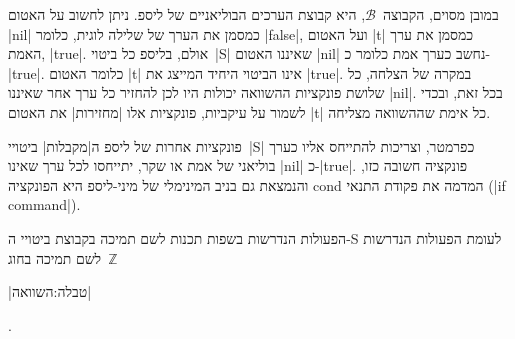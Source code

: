 במובן מסוים, הקבוצה~$\mathcal{B}$, היא קבוצת הערכים הבוליאניים של ליספ. ניתן
לחשוב על האטום \T|nil| כמסמן את הערך של שלילה לוגית, כלומר \E|false|, ועל האטום
\T|t| כמסמן את ערך האמת, \E|true|. אולם, בליספ כל ביטוי~\E|S| שאיננו האטום
\T|nil| נחשב כערך אמת כלומר כ-\E|true|. כלומר האטום \T|t| אינו הביטוי היחיד
המייצג את \E|true|. במקרה של הצלחה, כל שלושת פונקציות ההשוואה יכולות היו לכן
להחזיר כל ערך אחר שאיננו \T|nil|. בכל זאת, ובכדי לשמור על עיקביות, פונקציות אלו
\ע|מחזירות| את האטום \T|t| כל אימת שההשוואה מצליחה.

פונקציות אחרות של ליספ ה\ע|מקבלות| ביטויי~\E|S| כפרמטר, וצריכות להתייחס אליו
כערך בוליאני של אמת או שקר, יתייחסו לכל ערך שאינו \T|nil| כ-\E|true|. פונקציה
חשובה כזו, והנמצאת גם בניב המינימלי של מיני-ליספ היא הפונקציה cond המדמה את
פקודת התנאי (\E|if command|).

\begin{table}[!htbp]
  \caption[תמיכת שפות תכנות ב-$𝓢$ ובחוג~$ℤ$]{הפעולות הנדרשות בשפות תכנות לשם תמיכה בקבוצת ביטויי ה-S
  לעומת הפעולות הנדרשות לשם תמיכה בחוג~$ℤ$}
  |טבלה:השוואה|

\end{table}.

